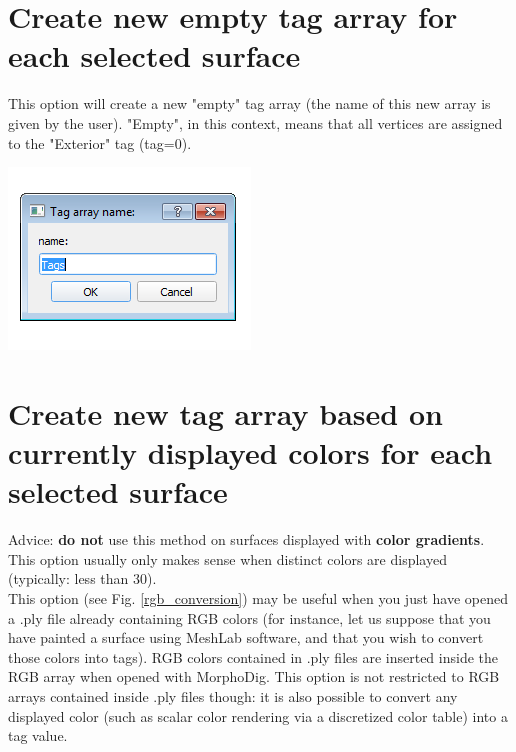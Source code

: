 \noindent



\section{Create new empty tag array for each selected surface}\label{empty_tag_array}

\begin{minipage}{0.5\textwidth}
This option will create a new "empty" tag array (the name of this new array is given by the user). "Empty", in this context, means that all vertices are assigned to the "Exterior" tag (tag=0).\end{minipage} 
\begin{minipage}{0.5\textwidth}\centering
  \includegraphics[scale=0.5]{images/12/empty_tag_array.png}
 \end{minipage} 



\section{Create new tag array based on currently displayed colors for each selected surface}
Advice: \textbf{do not} use this method on surfaces displayed with \textbf{color gradients}. This option usually only makes sense when distinct colors are displayed (typically: less than 30).\\
This option (see Fig. \ref{rgb_conversion}) may be useful when you just have opened a .ply file already containing RGB colors (for instance, let us suppose that you have painted a surface using MeshLab software, and that you wish to convert those colors into tags). RGB colors contained in .ply files are inserted inside the RGB array when opened with MorphoDig. This option is not restricted to RGB arrays contained inside .ply files though: it is also possible to convert any displayed color (such as scalar color rendering via a discretized color table) into a tag value. 

